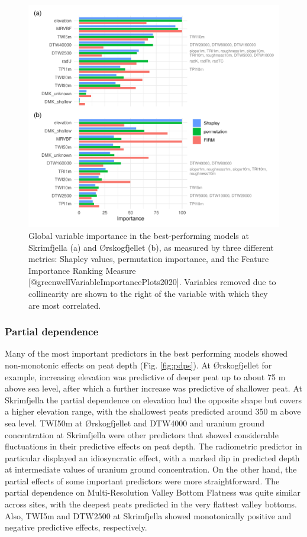 \documentclass[soil, manuscript]{copernicus}
\begin{document}
\begin{figure}
\includegraphics[width=1\linewidth]{figures/variable_importance} \caption{Global variable importance in the best-performing models at Skrimfjella (a) and Ørskogfjellet (b), as measured by three different metrics: Shapley values, permutation importance, and the Feature Importance Ranking Measure [@greenwellVariableImportancePlots2020]. Variables removed due to collinearity are shown to the right of the variable with which they are most correlated.}\label{fig:varImp}
\end{figure}

\subsubsection{Partial dependence}

Many of the most important predictors in the best performing models showed non-monotonic effects on peat depth (Fig. \ref{fig:pdps}).
At Ørskogfjellet for example, increasing elevation was predictive of deeper peat up to about 75 m above sea level, after which a further increase was predictive of shallower peat.
At Skrimfjella the partial dependence on elevation had the opposite shape but covers a higher elevation range, with the shallowest peats predicted around 350 m above sea level.
TWI50m at Ørskogfjellet and DTW4000 and uranium ground concentration at Skrimfjella were other predictors that showed considerable fluctuations in their predictive effects on peat depth.
The radiometric predictor in particular displayed an idiosyncratic effect, with a marked dip in predicted depth at intermediate values of uranium ground concentration.
On the other hand, the partial effects of some important predictors were more straightforward.
The partial dependence on Multi-Resolution Valley Bottom Flatness was quite similar across sites, with the deepest peats predicted in the very flattest valley bottoms.
Also, TWI5m and DTW2500 at Skrimfjella showed monotonically positive and negative predictive effects, respectively.
\end{document}
